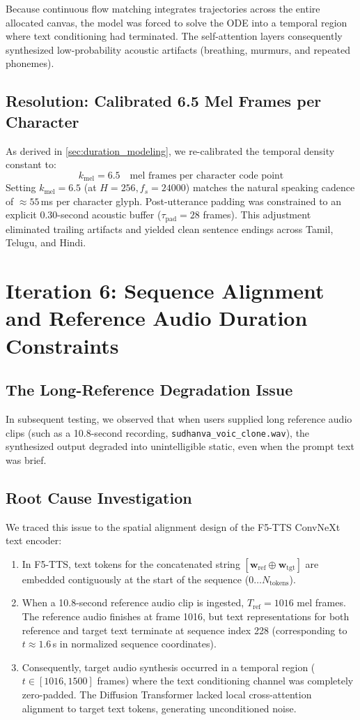 Because continuous flow matching integrates trajectories across the entire allocated canvas, the model was forced to solve the ODE into a temporal region where text conditioning had terminated. The self-attention layers consequently synthesized low-probability acoustic artifacts (breathing, murmurs, and repeated phonemes).

\subsection{Resolution: Calibrated 6.5 Mel Frames per Character}
As derived in \cref{sec:duration_modeling}, we re-calibrated the temporal density constant to:
\begin{equation}
    k_{\text{mel}} = 6.5 \quad \text{mel frames per character code point}
\end{equation}
Setting $k_{\text{mel}} = 6.5$ (at $H = 256, f_s = 24000$) matches the natural speaking cadence of $\approx 55$\,ms per character glyph. Post-utterance padding was constrained to an explicit 0.30-second acoustic buffer ($\tau_{\text{pad}} = 28$ frames). This adjustment eliminated trailing artifacts and yielded clean sentence endings across Tamil, Telugu, and Hindi.

\section{Iteration 6: Sequence Alignment and Reference Audio Duration Constraints}
\subsection{The Long-Reference Degradation Issue}
In subsequent testing, we observed that when users supplied long reference audio clips (such as a 10.8-second recording, \texttt{sudhanva\_voic\_clone.wav}), the synthesized output degraded into unintelligible static, even when the prompt text was brief.

\subsection{Root Cause Investigation}
We traced this issue to the spatial alignment design of the F5-TTS ConvNeXt text encoder:
\begin{enumerate}
    \item In F5-TTS, text tokens for the concatenated string $[\mathbf{w}_{\text{ref}} \oplus \mathbf{w}_{\text{tgt}}]$ are embedded contiguously at the start of the sequence ($0 \dots N_{\text{tokens}}$).
    \item When a 10.8-second reference audio clip is ingested, $T_{\text{ref}} = 1016$ mel frames. The reference audio finishes at frame 1016, but text representations for both reference and target text terminate at sequence index 228 (corresponding to $t \approx 1.6$\,s in normalized sequence coordinates).
    \item Consequently, target audio synthesis occurred in a temporal region ($t \in [1016, 1500]$ frames) where the text conditioning channel was completely zero-padded. The Diffusion Transformer lacked local cross-attention alignment to target text tokens, generating unconditioned noise.
\end{enumerate}

